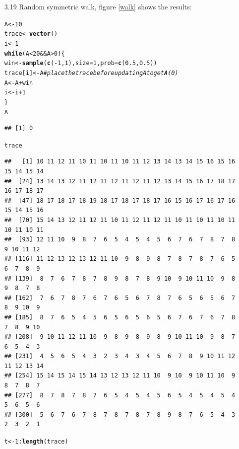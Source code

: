 \documentclass{article}\usepackage[]{graphicx}\usepackage[]{color}
\makeatletter
\newcommand{\hlcom}[1]{\textcolor[rgb]{0.678,0.584,0.686}{\textit{#1}}}%
\newcommand{\hlkwd}[1]{\textcolor[rgb]{0.737,0.353,0.396}{\textbf{#1}}}%
\newenvironment{kframe}{%
 \def\at@end@of@kframe{}%
 \ifinner\ifhmode%
  \def\at@end@of@kframe{\end{minipage}}%
  \begin{minipage}{\columnwidth}%
 \fi\fi%
 \def\FrameCommand##1{\hskip\@totalleftmargin \hskip-\fboxsep
 \colorbox{shadecolor}{##1}\hskip-\fboxsep
     \hskip-\linewidth \hskip-\@totalleftmargin \hskip\columnwidth}%
 \MakeFramed {\advance\hsize-\width
   \@totalleftmargin\z@ \linewidth\hsize
   \@setminipage}}%
 {\par\unskip\endMakeFramed%
 \at@end@of@kframe}
\newenvironment{knitrout}{}{} %
\makeatother
\begin{document}
\begin{itemize}
\item[3.19]  Random symmetric walk, figure \ref{walk} shows the results:\\
\begin{knitrout}
\color{fgcolor}\begin{kframe}
\begin{alltt}
A <- 10
trace <- \hlkwd{vector}()
i <- 1
\hlkwd{while} (A < 20 && A > 0) \{
    win <- \hlkwd{sample}(\hlkwd{c}(-1, 1), size = 1, prob = \hlkwd{c}(0.5, 0.5))
    trace[i] <- A  \hlcom{#place the trace before updating A to get \hlkwd{A}(0)}
    A <- A + win
    i <- i + 1
\}
A
\end{alltt}
\begin{verbatim}
## [1] 0
\end{verbatim}
\begin{alltt}
trace
\end{alltt}
\begin{verbatim}
##   [1] 10 11 12 11 10 11 10 11 10 11 12 13 14 13 14 15 16 15 16 15 14 15 14
##  [24] 13 14 13 12 11 12 11 12 11 12 11 12 13 14 15 16 17 18 17 16 17 18 17
##  [47] 18 17 18 17 18 19 18 17 18 17 18 17 16 15 16 17 16 17 16 15 14 15 16
##  [70] 15 14 13 12 11 12 11 10 11 12 11 12 11 10 11 10 11 10 11 10 11 10 11
##  [93] 12 11 10  9  8  7  6  5  4  5  4  5  6  7  6  7  8  7  8  9 10 11 12
## [116] 11 12 13 12 13 12 11 10  9  8  9  8  7  8  7  8  7  6  5  6  7  8  9
## [139]  8  7  6  7  8  7  8  9  8  7  8  9 10  9 10 11 10  9  8  9  8  7  8
## [162]  7  6  7  8  7  6  7  6  5  6  7  8  7  6  5  6  5  6  7  8  9 10  9
## [185]  8  7  6  5  4  5  6  5  6  5  6  5  6  7  6  7  6  7  8  7  8  9 10
## [208]  9 10 11 12 11 10  9  8  9  8  9  8  9 10 11 10  9  8  7  6  5  4  3
## [231]  4  5  6  5  4  3  2  3  4  3  4  5  6  7  8  9 10 11 12 11 12 13 14
## [254] 15 14 15 14 15 14 13 12 13 12 11 10  9 10  9 10 11 10  9  8  7  8  7
## [277]  8  7  8  7  8  7  6  5  4  5  4  5  6  5  4  5  4  5  4  5  6  5  6
## [300]  5  6  7  6  7  8  7  8  7  8  7  8  9  8  7  6  5  4  3  2  3  2  1
\end{verbatim}
\begin{alltt}
t <- 1:\hlkwd{length}(trace)
\end{alltt}
\end{kframe}
\end{knitrout}


\end{itemize}
\end{document}
